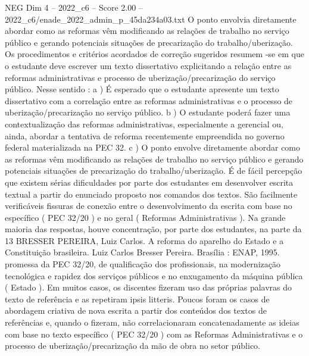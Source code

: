 \begin{textsample}{NEG Dim 4 – 2022\_c6 – Score 2.00 – 2022\_c6/enade\_2022\_admin\_p\_45da234a03.txt}
O ponto envolvia diretamente abordar como as reformas vêm modificando as relações de trabalho no serviço público e gerando potenciais situações de precarização do trabalho/uberização.
Os procedimentos e critérios acordados de correção sugeridos resumem -se em que o estudante deve escrever um texto dissertativo explicitando a relação entre as reformas administrativas e processo de uberização/precarização do serviço público.
Nesse sentido : a ) É esperado que o estudante apresente um texto dissertativo com a correlação entre as reformas administrativas e o processo de uberização/precarização no serviço público. b ) O estudante poderá fazer uma contextualização das reformas administrativas, especialmente a gerencial ou, ainda, abordar a tentativa de reforma recentemente empreendida no governo federal materializada na PEC 32. c ) O ponto envolve diretamente abordar como as reformas vêm modificando as relações de trabalho no serviço público e gerando potenciais situações de precarização do trabalho/uberização.
É de fácil percepção que existem sérias dificuldades por parte dos estudantes em desenvolver escrita textual a partir do enunciado proposto nos comandos dos textos.
São facilmente verificáveis fissuras de conexão entre o desenvolvimento da escrita com base no específico ( PEC 32/20 ) e no geral ( Reformas Administrativas ).
Na grande maioria das respostas, houve concentração, por parte dos estudantes, na parte da 13 BRESSER PEREIRA, Luiz Carlos.
A reforma do aparelho do Estado e a Constituição brasileira.
Luiz Carlos Bresser Pereira.
Brasília : ENAP, 1995. promessa da PEC 32/20, de qualificação dos profissionais, na modernização tecnológica e rapidez dos serviços públicos e no enxugamento da máquina pública ( Estado ).
Em muitos casos, os discentes fizeram uso das próprias palavras do texto de referência e as repetiram ipsis litteris.
Poucos foram os casos de abordagem criativa de nova escrita a partir dos conteúdos dos textos de referências e, quando o fizeram, não correlacionaram concatenadamente as ideias com base no texto específico ( PEC 32/20 ) com as Reformas Administrativas e o processo de uberização/precarização da mão de obra no setor público.

\end{textsample}
